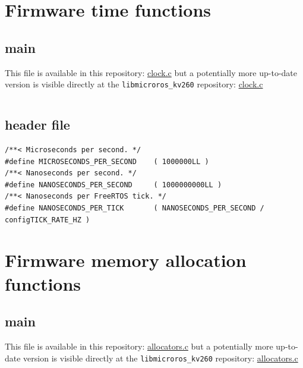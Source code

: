 \documentclass[10pt]{article}
\begin{document}
\pagebreak
\section{Firmware time functions}
\label{sec:org31b7fd1}

\subsection{main}
\label{sec:orgd4645e5}
This file is available in this repository: \href{https://gitlab.com/sunoc/xilinx-kria-kv260-documentation/-/blob/b7300116e153f4b5a1542f8804e4646db8030033/src/clock.c}{clock.c}
but a potentially more up-to-date version is visible
directly at the \texttt{libmicroros\_kv260} repository: \href{https://gitlab.com/sunoc/libmicroros\_kv260/-/blob/4867e762f66af7b4647232eb4c0a31106db66e13/src/clock.c}{clock.c}

\inputminted[linenos, frame=single]{c}{./src/clock.c}

\subsection{header file}
\label{sec:org8ec4bae}
\begin{verbatim}
/**< Microseconds per second. */
#define MICROSECONDS_PER_SECOND    ( 1000000LL )  
/**< Nanoseconds per second. */
#define NANOSECONDS_PER_SECOND     ( 1000000000LL ) 
/**< Nanoseconds per FreeRTOS tick. */  
#define NANOSECONDS_PER_TICK       ( NANOSECONDS_PER_SECOND / configTICK_RATE_HZ ) 
\end{verbatim}


\pagebreak
\section{Firmware memory allocation functions}
\label{sec:org7e68c7f}

\subsection{main}
\label{sec:org7a74bc0}
This file is available in this repository: \href{https://gitlab.com/sunoc/xilinx-kria-kv260-documentation/-/blob/b7300116e153f4b5a1542f8804e4646db8030033/src/allocators.c}{allocators.c}
but a potentially more up-to-date version is visible
directly at the \texttt{libmicroros\_kv260} repository: \href{https://gitlab.com/sunoc/libmicroros\_kv260/-/blob/4867e762f66af7b4647232eb4c0a31106db66e13/src/allocators.c}{allocators.c}
\end{document}
